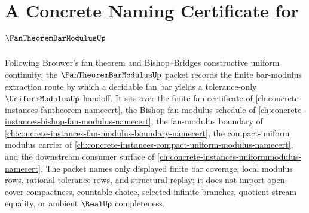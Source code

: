 \chapter{A Concrete Naming Certificate for $\FanTheoremBarModulusUp$}
\label{ch:concrete-instances-fan-theorem-bar-modulus-namecert}

Following Brouwer's fan theorem and Bishop--Bridges constructive uniform continuity, the $\FanTheoremBarModulusUp$ packet records the finite bar-modulus extraction route by which a decidable fan bar yields a tolerance-only $\UniformModulusUp$ handoff. It sits over the finite fan certificate of \autoref{ch:concrete-instances-fantheorem-namecert}, the Bishop fan-modulus schedule of \autoref{ch:concrete-instances-bishop-fan-modulus-namecert}, the fan-modulus boundary of \autoref{ch:concrete-instances-fan-modulus-boundary-namecert}, the compact-uniform modulus carrier of \autoref{ch:concrete-instances-compact-uniform-modulus-namecert}, and the downstream consumer surface of \autoref{ch:concrete-instances-uniformmodulus-namecert}. The packet names only displayed finite bar coverage, local modulus rows, rational tolerance rows, and structural replay; it does not import open-cover compactness, countable choice, selected infinite branches, quotient stream equality, or ambient $\RealUp$ completeness.

